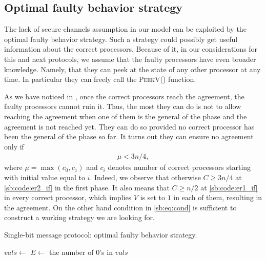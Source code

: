 \subsection{Optimal faulty behavior strategy}
The lack of secure channels assumption in our model can be exploited by the optimal faulty behavior strategy. Such a strategy could possibly get useful information about the correct processors. Because of it, in our considerations for this and next protocols, we assume that the faulty processors have even broader knowledge. Namely, that they can peek at the state of any other processor at any time. In particular they can freely call the \textsc{PeekV()} function.

As we have noticed in , once the correct processors reach the agreement, the faulty processors cannot ruin it. Thus, the most they can do is not to allow reaching the agreement when one of them is the general of the phase and the agreement is not reached yet. They can do so provided no correct processor has been the general of the phase so far. It turns out they can ensure no agreement only if 
\begin{align}
    \mu < 3n/4, \label{sb:eq:cond}
\end{align}
where $\mu=\max(c_0, c_1)$ and $c_i$ denotes number of correct processors starting with initial value equal to $i$. Indeed, we observe that otherwise $C\geq 3n/4$ at \cref{sb:code:er2_if} in the first phase. It also means that $C\geq n/2$ at \cref{sb:code:er1_if} in every correct processor, which implies $V$ is set to $1$ in each of them, resulting in the agreement. On the other hand condition in \cref{sb:eq:cond} is sufficient to construct a working strategy we are looking for.

\begin{algorithm} [H]
  \caption{Single-bit message protocol: optimal faulty behavior strategy.}
  \begin{algorithmic}[1]
        \State $vals \gets$ 
        \State $E \gets$ the number of $0$'s in $vals$
         \label{sbofb:code:er0_if}
            \State {}
        \Else
            \State {}
        \EndIf
        \\
        \State {}
                \State {}
            \EndFor
                \State {}
            \EndFor
        \EndIf
        \\
        \State {}
    \EndFor
  \end{algorithmic}
\end{algorithm}

